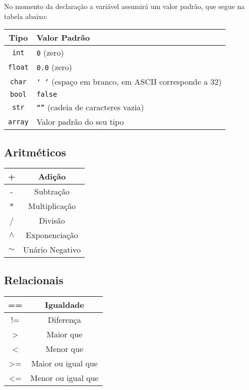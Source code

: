 \documentclass[a4paper,12pt]{article}
\begin{document}
No momento da declaração a variável assumirá um valor padrão, que segue na tabela abaixo:
\\
\begin{center}
    \begin{tabular}{|c|l|}
         \hline
         \textbf{Tipo} & \textbf{Valor Padrão}\\
         \hline
         \texttt{int} & \texttt{0} (zero)\\
         \hline
         \texttt{float} & \texttt{0.0} (zero)\\
         \hline
         \texttt{char} & \texttt{` '} (espaço em branco, em ASCII corresponde a 32)\\
         \hline
         \texttt{bool} & \texttt{false}\\
         \hline
         \texttt{str} & \texttt{``''} (cadeia de caracteres vazia)\\
         \hline
         \texttt{array} & Valor padrão do seu tipo\\
         \hline
    \end{tabular}
\end{center}

\subsection{Aritméticos}
\begin{center}
    \begin{tabular}{|c|c|}
         \hline
         + & Adição\\
         \hline
         - & Subtração\\
         \hline
         $\ast$ & Multiplicação\\
         \hline
         / & Divisão\\
         \hline
         $\wedge$ & Exponenciação\\
         \hline
         $\sim$ & Unário Negativo\\
         \hline
    \end{tabular}
\end{center}

\subsection{Relacionais}
\begin{center}
    \begin{tabular}{|c|c|}
         \hline
         == & Igualdade\\
         \hline
         != & Diferença\\
         \hline
         > & Maior que\\
         \hline
         < & Menor que\\
         \hline
         >= & Maior ou igual que\\
         \hline
         <= & Menor ou igual que\\
         \hline
    \end{tabular}
\end{center}
\end{document}
